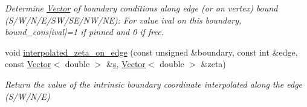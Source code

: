 \begin{DoxyCompactItemize}
\begin{DoxyCompactList}\small\item\em Determine \hyperlink{classoomph_1_1Vector}{Vector} of boundary conditions along edge (or on vertex) bound (S/\+W/\+N/\+E/\+S\+W/\+S\+E/\+N\+W/\+NE)\+: For value ival on this boundary, bound\+\_\+cons\mbox{[}ival\mbox{]}=1 if pinned and 0 if free. \end{DoxyCompactList}\item 
void \hyperlink{classoomph_1_1RefineableQElement_3_012_01_4_af7796513af01efa2ad009876e81abe3b}{interpolated\+\_\+zeta\+\_\+on\+\_\+edge} (const unsigned \&boundary, const int \&edge, const \hyperlink{classoomph_1_1Vector}{Vector}$<$ double $>$ \&\hyperlink{cfortran_8h_ab7123126e4885ef647dd9c6e3807a21c}{s}, \hyperlink{classoomph_1_1Vector}{Vector}$<$ double $>$ \&zeta)
\begin{DoxyCompactList}\small\item\em Return the value of the intrinsic boundary coordinate interpolated along the edge (S/\+W/\+N/E) \end{DoxyCompactList}\end{DoxyCompactItemize}
